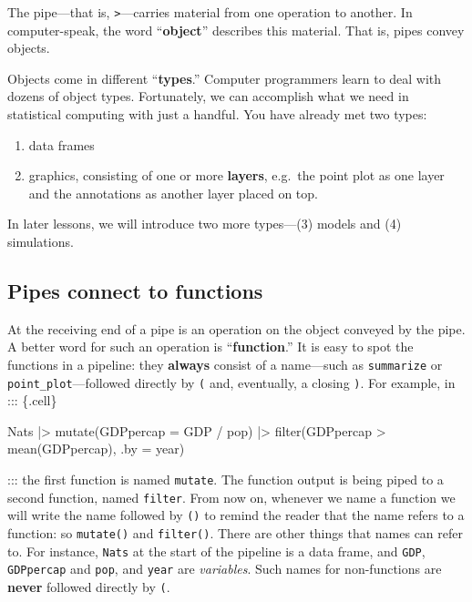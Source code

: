 \documentclass[
  letterpaper,
  DIV=11,
  numbers=noendperiod,
  oneside]{scrartcl}
\newenvironment{Shaded}{\begin{snugshade}}{\end{snugshade}}
\newcommand{\AttributeTok}[1]{\textcolor[rgb]{0.40,0.45,0.13}{#1}}
\newcommand{\FunctionTok}[1]{\textcolor[rgb]{0.28,0.35,0.67}{#1}}
\newcommand{\NormalTok}[1]{\textcolor[rgb]{0.00,0.23,0.31}{#1}}
\newcommand{\SpecialCharTok}[1]{\textcolor[rgb]{0.37,0.37,0.37}{#1}}
\providecommand{\tightlist}{%
  \setlength{\itemsep}{0pt}\setlength{\parskip}{0pt}}\usepackage{longtable,booktabs,array}
\begin{document}
The pipe---that is, \texttt{\textbar{}\textgreater{}}---carries material
from one operation to another. In computer-speak, the word
``\textbf{object}'' describes this material. That is, pipes convey
objects.

Objects come in different ``\textbf{types}.'' Computer programmers learn
to deal with dozens of object types. Fortunately, we can accomplish what
we need in statistical computing with just a handful. You have already
met two types:

\begin{enumerate}
\def\labelenumi{\arabic{enumi}.}
\tightlist
\item
  data frames
\item
  graphics, consisting of one or more \textbf{layers}, e.g.~the point
  plot as one layer and the annotations as another layer placed on top.
\end{enumerate}

In later lessons, we will introduce two more types---(3) models and (4)
simulations.

\subsection{Pipes connect to
functions}\label{pipes-connect-to-functions}

At the receiving end of a pipe is an operation on the object conveyed by
the pipe. A better word for such an operation is ``\textbf{function}.''
It is easy to spot the functions in a pipeline: they \textbf{always}
consist of a name---such as \texttt{summarize} or
\texttt{point\_plot}---followed directly by \texttt{(} and, eventually,
a closing \texttt{)}. For example, in ::: \{.cell\}

\begin{Shaded}
\begin{Highlighting}[]
\NormalTok{Nats }\SpecialCharTok{|\textgreater{}}
  \FunctionTok{mutate}\NormalTok{(}\AttributeTok{GDPpercap =}\NormalTok{ GDP }\SpecialCharTok{/}\NormalTok{ pop) }\SpecialCharTok{|\textgreater{}}
  \FunctionTok{filter}\NormalTok{(GDPpercap }\SpecialCharTok{\textgreater{}} \FunctionTok{mean}\NormalTok{(GDPpercap), }\AttributeTok{.by =}\NormalTok{ year)}
\end{Highlighting}
\end{Shaded}

::: the first function is named \texttt{mutate}. The function output is
being piped to a second function, named \texttt{filter}. From now on,
whenever we name a function we will write the name followed by
\texttt{()} to remind the reader that the name refers to a function: so
\texttt{mutate()} and \texttt{filter()}. There are other things that
names can refer to. For instance, \texttt{Nats} at the start of the
pipeline is a data frame, and \texttt{GDP}, \texttt{GDPpercap} and
\texttt{pop}, and \texttt{year} are \emph{variables}. Such names for
non-functions are \textbf{never} followed directly by \texttt{(}.
\end{document}
